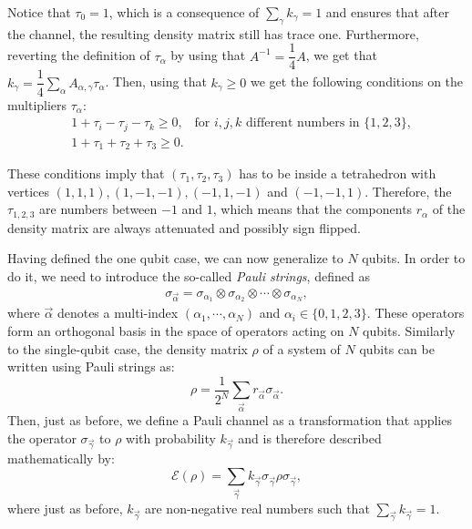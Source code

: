 \documentclass[10pt,letterpaper]{article} %
\begin{document}
Notice that $\tau_0 = 1$, which is a consequence of $\sum_{\gamma}k_{\gamma}=1$
and ensures that after the channel, the resulting density matrix still has trace one. 
Furthermore, reverting the definition of $\tau_{\alpha}$ by using that $A^{-1} = \dfrac{1}{4} A$, 
we get that $k_{\gamma} = \dfrac{1}{4} \sum_{\alpha} A_{\alpha,\gamma} \tau_{\alpha}$.
Then, using that $k_{\gamma} \geq 0$
we get the following conditions on the multipliers $\tau_{\alpha}$:
\begin{eqnarray}
\label{eq: conditions-tetrahedron}
&1+\tau_i -\tau_j - \tau_k \geq 0,  \;\;\; \text{for $i,j,k$ different numbers in $\{1,2,3\}$}, \\
&1+\tau_1 + \tau_2 + \tau_3 \geq 0.
\end{eqnarray}

These conditions imply that $(\tau_1,\tau_2,\tau_3)$
has to be inside a tetrahedron with
vertices $(1,1,1), (1,-1,-1), (-1,1,-1)$ and $(-1,-1,1)$. 
Therefore, the $\tau_{1,2,3}$ are numbers between 
$-1$ and $1$, which means that the components
$r_{\alpha}$ of the density matrix are always 
attenuated and possibly sign flipped.

Having defined the one qubit case,  we can now generalize to $N$ qubits.
In order to do it, we need to introduce the so-called \textit{Pauli strings}, defined as
\begin{eqnarray}
\label{eq: Pauli string}
\sigma_{\vec{\alpha}} = \sigma_{\alpha_1} \otimes \sigma_{\alpha_2}\otimes \cdots \otimes \sigma_{\alpha_N},
\end{eqnarray}
where $\vec{\alpha}$ denotes a multi-index $(\alpha_1, \cdots, \alpha_N)$
 and $\alpha_i \in \{0,1,2,3\}$. 
These operators form an orthogonal basis in the space of operators acting on $N$ qubits. 
 Similarly to the single-qubit case, the density matrix $\rho$ 
of a system of $N$ qubits can be written using Pauli strings as:
\begin{equation}
\label{eq:  Density matrix Nqbit}
\rho = \dfrac{1}{2^N} \sum_{\vec{\alpha}} r_{\vec{\alpha}} \sigma_{\vec{\alpha}}.
\end{equation}
Then, just as before, we define a Pauli channel as a transformation that applies 
the operator $\sigma_{\vec{\gamma}}$ to $\rho$ with probability $k_{\vec{\gamma}}$
and is therefore described mathematically by:
\begin{equation}
\label{eq: pauli channel N-qubit}
\mathcal{E}(\rho) = \sum_{\vec{\gamma}} k_{\vec{\gamma}} \sigma_{\vec{\gamma}} \rho \sigma_{\vec{\gamma}},
\end{equation}
where just as before, $k_{\vec{\gamma}}$ are non-negative real numbers such 
that $\sum_{\vec{\gamma}} k_{\vec{\gamma}}=1$.
\end{document}
